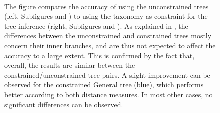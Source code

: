 \begin{figure}[hpbt]
{        %
        \\
        The figure compares the accuracy of using the unconstrained trees (left,
        Subfigures  and ) to
        using the  taxonomy as constraint for the tree inference (right, Subfigures
         and ).
        As explained in ,
        the differences between the unconstrained and constrained trees mostly concern their inner branches,
        and are thus not expected to affect the accuracy to a large extent.
        This is confirmed by the fact that, overall, the results are similar between the constrained/unconstrained tree pairs.
        A slight improvement can be observed for the constrained General tree (blue),
        which performs better according to both distance measures.
        In most other cases, no significant differences can be observed.
    }
    \label{fig:constraints_backbone}
\end{figure}

